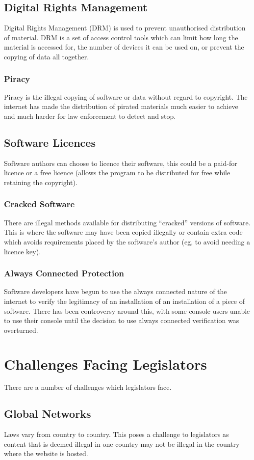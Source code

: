 \documentclass[a4paper,11pt, twocolumn]{article}
\begin{document}
\subsection{Digital Rights Management}
Digital Rights Management (DRM) is used to prevent unauthorised distribution of material. DRM is a set of access control tools which can limit how long the material is accessed for, the number of devices it can be used on, or prevent the copying of data all together.
\subsubsection{Piracy}
Piracy is the illegal copying of software or data without regard to copyright. The internet has made the distribution of pirated materials much easier to achieve and much harder for law enforcement to detect and stop.
\subsection{Software Licences}
Software authors can choose to licence their software, this could be a paid-for licence or a free licence (allows the program to be distributed for free while retaining the copyright). 
\subsubsection{Cracked Software}
There are illegal methods available for distributing ``cracked'' versions of software. This is where the software may have been copied illegally or contain extra code which avoids requirements placed by the software's author (eg, to avoid needing a licence key). 
\subsubsection{Always Connected Protection}
Software developers have begun to use the always connected nature of the internet to verify the legitimacy of an installation of an installation of a piece of software. There has been controversy around this, with some console users unable to use their console until the decision to use always connected verification was overturned.
\section{Challenges Facing Legislators}
There are a number of challenges which legislators face.
\subsection{Global Networks}
Laws vary from country to country. This poses a challenge to legislators as content that is deemed illegal in one country may not be illegal in the country where the website is hosted. 
\end{document}
